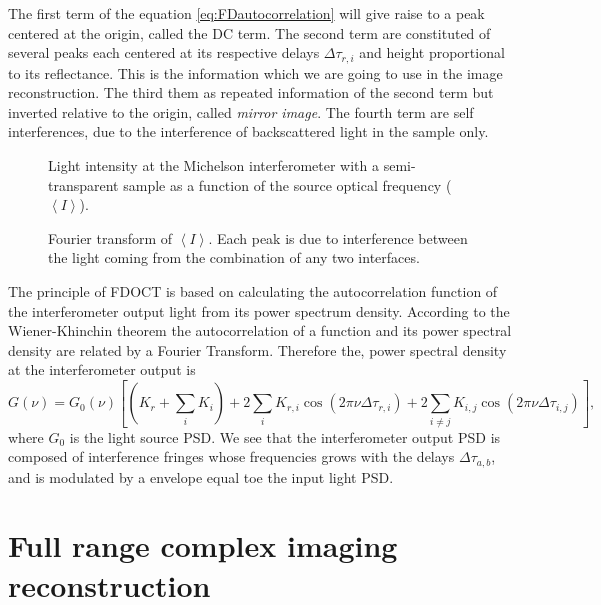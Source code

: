 \documentclass[12pt,twoside,english]{book}
\renewcommand{\~}{\perispomeni}%
\numberwithin{equation}{section}
\numberwithin{figure}{section}
\begin{document}
The first term of the equation \ref{eq:FDautocorrelation} will give raise to a peak centered at the origin, called the DC term. The second term are constituted of several peaks each centered at its respective delays $\Delta\tau_{r,i}$ and height proportional to its reflectance. This is the information which we are going to use in the image reconstruction.
The third them as repeated information of the second term but inverted relative to the origin, called \emph{mirror image}. The fourth term are self interferences, due to the interference of backscattered light in the sample only.

%
\begin{figure}[h]
%
\begin{minipage}[t]{0.48\columnwidth}%
\caption{Light intensity at the Michelson interferometer with a semi-transparent sample as a function of the source optical frequency ($\left<I\right>$). \label{fig:graphics interference bi-layer}}
%
\end{minipage}\hfill{}%
\begin{minipage}[t]{0.48\columnwidth}%
\caption{Fourier transform of $\left<I\right>$. Each peak is due to interference between the light coming from the combination of any two interfaces. \label{fig:ft graph interferometer bi-layer}}
%
\end{minipage}
\end{figure}

The principle of \gls{FDOCT} is based on calculating the autocorrelation function of the interferometer output light from its power spectrum density. According to the Wiener-Khinchin theorem the autocorrelation of a function and its power spectral density are related by a Fourier Transform. Therefore the, power spectral density at the interferometer output is
\begin{equation}
G\left(\nu\right)=G_{0}\left(\nu\right)\left[\left(K_{r}+\sum_{i}K_{i}\right)+2\sum_{i}K_{r,i}\cos\left(2\pi\nu\Delta\tau_{r,i}\right)+2\sum_{i\ne j}K_{i,j}\cos\left(2\pi\nu\Delta\tau_{i,j}\right)\right],
\label{eq:FDOCT output spectrum}
\end{equation}
where $G_{0}$ is the light source \gls{PSD}. We see that the interferometer output \gls{PSD} is composed of interference fringes whose frequencies grows with the delays $\Delta\tau_{a,b}$, and is modulated by a envelope equal toe the input light \gls{PSD}.

\section{Full range complex imaging reconstruction}
\end{document}
